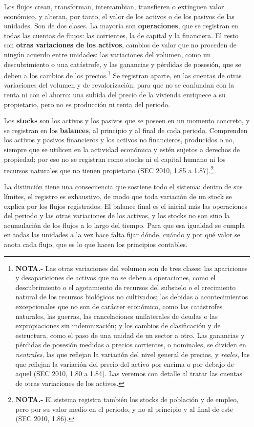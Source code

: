 \documentclass[10pt,a4paper]{article}
\begin{document}
Los flujos crean, transforman, intercambian, transfieren o extinguen valor económico, y alteran, por tanto, el valor de los activos o de los pasivos de las unidades. Son de dos clases. La mayoría son \textbf{operaciones}, que se registran en todas las cuentas de flujos: las corrientes, la de capital y la financiera. El resto son \textbf{otras variaciones de los activos}, cambios de valor que no proceden de ningún acuerdo entre unidades: las variaciones del volumen, como un descubrimiento o una catástrofe, y las ganancias y pérdidas de posesión, que se deben a los cambios de los precios.\footnote{%
  \textbf{NOTA.-} Las otras variaciones del volumen son de tres clases: las apariciones y desapariciones de activos que no se deben a operaciones, como el descubrimiento o el agotamiento de recursos del subsuelo o el crecimiento natural de los recursos biológicos no cultivados; las debidas a acontecimientos excepcionales que no son de carácter económico, como las catástrofes naturales, las guerras, las cancelaciones unilaterales de deudas o las expropiaciones sin indemnización; y los cambios de clasificación y de estructura, como el paso de una unidad de un sector a otro. Las ganancias y pérdidas de posesión medidas a precios corrientes, o nominales, se dividen en \textit{neutrales}, las que reflejan la variación del nivel general de precios, y \textit{reales}, las que reflejan la variación del precio del activo por encima o por debajo de aquel (SEC 2010, 1.80 a 1.84). Las veremos con detalle al tratar las cuentas de otras variaciones de los activos.
} Se registran aparte, en las cuentas de otras variaciones del volumen y de revalorización, para que no se confundan con la renta ni con el ahorro: una subida del precio de la vivienda enriquece a su propietario, pero no es producción ni renta del periodo.

Los \textbf{stocks} son los activos y los pasivos que se poseen en un momento concreto, y se registran en los \textbf{balances}, al principio y al final de cada periodo. Comprenden los activos y pasivos financieros y los activos no financieros, producidos o no, siempre que se utilicen en la actividad económica y estén sujetos a derechos de propiedad; por eso no se registran como stocks ni el capital humano ni los recursos naturales que no tienen propietario (SEC 2010, 1.85 a 1.87).\footnote{%
  \textbf{NOTA.-} El sistema registra también los stocks de población y de empleo, pero por su valor medio en el periodo, y no al principio y al final de este (SEC 2010, 1.86).
}

La distinción tiene una consecuencia que sostiene todo el sistema: dentro de sus límites, el registro es exhaustivo, de modo que toda variación de un stock se explica por los flujos registrados. El balance final es el inicial más las operaciones del periodo y las otras variaciones de los activos, y los stocks no son sino la acumulación de los flujos a lo largo del tiempo. Para que esa igualdad se cumpla en todas las unidades a la vez hace falta fijar dónde, cuándo y por qué valor se anota cada flujo, que es lo que hacen los principios contables.
\end{document}
